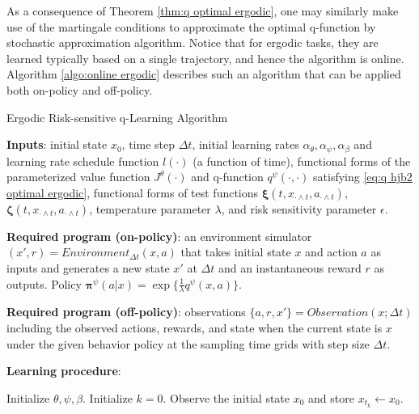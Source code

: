 As a consequence of Theorem \ref{thm:q optimal ergodic}, one may similarly make use of the martingale conditions to approximate the optimal q-function by stochastic approximation algorithm. Notice that for ergodic tasks, they are learned typically based on a single trajectory, and hence the algorithm is online. Algorithm \ref{algo:online ergodic} describes such an algorithm that can be applied both on-policy and off-policy.

\begin{algorithm}[htbp]
	\caption{Ergodic Risk-sensitive q-Learning Algorithm}
	\textbf{Inputs}: initial state $x_0$, time step $\Delta t$, initial learning rates $\alpha_{\theta},\alpha_{\psi},\alpha_{\beta}$ and learning rate schedule function $l(\cdot)$ (a function of time), functional forms of the parameterized value function $J^{\theta}(\cdot)$ and q-function $q^{\psi}(\cdot,\cdot)$ satisfying \eqref{eq:q hjb2 optimal ergodic}, functional forms of  test functions $\bm{\xi}(t,x_{\cdot \wedge t},a_{\cdot \wedge t})$, $\bm{\zeta}(t,x_{\cdot \wedge t},a_{\cdot \wedge t})$, temperature parameter $\lambda$, and risk sensitivity parameter $\epsilon$.
	
	
	\textbf{Required program (on-policy)}: an environment simulator $(x',r) = \textit{Environment}_{\Delta t}(x,a)$ that takes initial state $x$ and action $a$ as inputs and generates a new state $x'$ at $\Delta t$ and an instantaneous reward $r$ as outputs. Policy $\bm\pi^{\psi}(a|x) = \exp\{  \frac{1}{\lambda}q^{\psi}(x,a) \}$.
	
	\textbf{Required program (off-policy)}: observations $ \{a, r, x'\} = \textit{Observation}( x;\Delta t)$ including  the observed actions, rewards, and state when the current state is $x$ under the given behavior policy at the sampling time grids with step size $\Delta t$.
	
	
	\textbf{Learning procedure}:
	\begin{algorithmic}
		\State Initialize $\theta,\psi,\beta$. Initialize $k = 0$. Observe the initial state $x_0$ and store $x_{t_k} \leftarrow  x_0$.
		\Loop {}
\end{algorithmic}
\end{algorithm}
